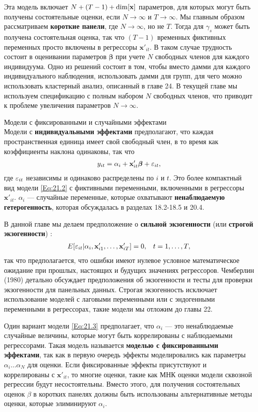 Эта модель включает $N+(T-1)+\dim[\mathbf{x}]$ параметров, для которых могут быть получены состоятельные оценки, если $N\rightarrow \infty$ и $T \rightarrow \infty$. Мы главным образом рассматриваем \textbf{короткие панели}, где $N\rightarrow \infty$, но не $T$. Тогда для $\gamma_s$ может быть получена состоятельная оценка, так что $(T-1)$ временных фиктивных переменных просто включены в регрессоры $\mathbf x'_{it}$. В таком случае трудность состоит в оценивании параметров $\bm\beta$ при учете $N$ свободных членов для каждого индивидуума. Одно из решений состоит в том, чтобы вместо дамми для каждого индивидуального наблюдения, использовать дамми для групп, для чего можно использовать кластерный анализ, описанный в главе 24. В текущей главе мы используем спецификацию с полным набором $N$ свободных членов, что приводит к проблеме увеличения параметров $N \rightarrow \infty$.


{\centering
Модели с фиксированными и случайными эффектами\\}
Модели с \textbf{индивидуальными эффектами} предполагают, что каждая пространственная единица имеет свой свободный член, в то время как коэффициенты наклона одинаковы, так что 
\begin{align}
y_{it}=\alpha_i + \mathbf x'_{it} \bm \beta + \varepsilon_{it},
\label{Eq:21.3}
\end{align}
где $\varepsilon_{it}$ независимы и одинаково распределены по $i$ и $t$.  Это более компактный вид модели \ref{Eq:21.2} с фиктивными переменными, включенными в регрессоры $\mathbf x'_{it}$. $\alpha_i$ --- случайные переменные, которые охватывают \textbf{ненаблюдаемую гетерогенность}, которая обсуждалась в разделах 18.2-18.5 и 20.4.

В данной главе мы делаем предположение о \textbf{сильной экзогенности} (или \textbf{строгой экзогенности}) :
\begin{align}
E[\varepsilon_{it} | \alpha_i, \mathbf x'_{i1}, \dots, \mathbf x'_{iT}]=0, &
& t=1, \dots, T,
\label{Eq:21.4}
\end{align}
так что предполагается, что ошибки имеют нулевое условное математическое ожидание при прошлых, настоящих и будущих значениях регрессоров. Чемберлин (1980) детально обсуждает предположения об экзогенности и тесты для проверки экзогенности для панельных данных. Строгая экзогенность исключает использование моделей с лаговыми переменными или с эндогенными переменными в регрессорах, такие модели мы отложим до главы 22.

Один вариант модели \ref{Eq:21.3} предполагает, что $\alpha_i$ --- это ненаблюдаемые случайные величины, которые могут быть коррелированы с наблюдаемыми регрессорами. Такая модель называется \textbf{моделью с фиксированными эффектами}, так как в первую очередь эффекты моделировались как параметры $\alpha_i \dots \alpha_N$ для оценки. Если фиксированные эффекты присутствуют и коррелированы с $\mathbf x'_{it}$, то многие оценки, такие как МНК оценки модели сквозной регрессии будут несостоятельны. Вместо этого, для получения состоятельных оценок $\beta$ в коротких панелях должны быть использованы альтернативные методы оценки, которые элиминируют $\alpha_i$.

